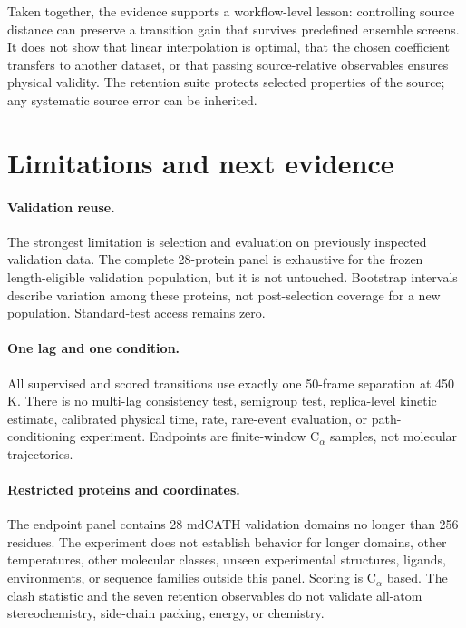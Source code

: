 \documentclass{article}
\newcommand{\CA}{C$_\alpha$}
\begin{document}
Taken together, the evidence supports a workflow-level lesson: controlling source distance can preserve a transition gain that survives predefined ensemble screens. It does not show that linear interpolation is optimal, that the chosen coefficient transfers to another dataset, or that passing source-relative observables ensures physical validity. The retention suite protects selected properties of the source; any systematic source error can be inherited.

\section{Limitations and next evidence}
\label{sec:limitations}

\paragraph{Validation reuse.} The strongest limitation is selection and evaluation on previously inspected validation data. The complete 28-protein panel is exhaustive for the frozen length-eligible validation population, but it is not untouched. Bootstrap intervals describe variation among these proteins, not post-selection coverage for a new population. Standard-test access remains zero.

\paragraph{One lag and one condition.} All supervised and scored transitions use exactly one 50-frame separation at 450 K. There is no multi-lag consistency test, semigroup test, replica-level kinetic estimate, calibrated physical time, rate, rare-event evaluation, or path-conditioning experiment. Endpoints are finite-window \CA{} samples, not molecular trajectories.

\paragraph{Restricted proteins and coordinates.} The endpoint panel contains 28 mdCATH validation domains no longer than 256 residues. The experiment does not establish behavior for longer domains, other temperatures, other molecular classes, unseen experimental structures, ligands, environments, or sequence families outside this panel. Scoring is \CA{} based. The clash statistic and the seven retention observables do not validate all-atom stereochemistry, side-chain packing, energy, or chemistry.
\end{document}

